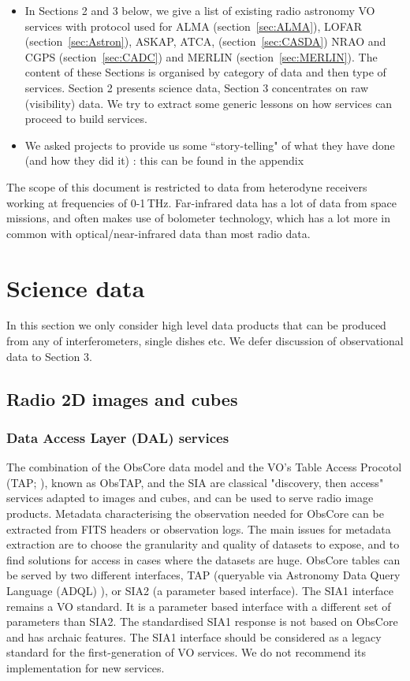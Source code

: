 \documentclass[11pt,a4paper]{ivoa}
\begin{document}
\begin{itemize}
\item  In Sections 2 and 3 below, we give a list of existing radio astronomy VO services with protocol 
used for ALMA (section~\ref{sec:ALMA}), LOFAR (section~\ref{sec:Astron}), ASKAP, ATCA,
(section~\ref{sec:CASDA}) NRAO and CGPS (section~\ref{sec:CADC}) and MERLIN (section~\ref{sec:MERLIN}).
The content of these Sections is organised  by category of data and then type of services. Section 2 
presents science data, Section 3 concentrates on raw (visibility) data. We try to extract some generic 
lessons on how services can proceed to build services.
\item We asked projects to provide us some ``story-telling" of what they have done (and how they did 
it) : this can be found in the appendix
\end{itemize}

The scope of this document is restricted to data from heterodyne receivers working at frequencies of 
0-1\,THz. Far-infrared data has a lot of data from space missions, and often makes use of bolometer 
technology, which has a lot more in common with optical/near-infrared data than most radio data.

\section{Science data}

In this section we only consider high level data products that can be produced from any of 
interferometers, single dishes etc. We defer discussion of observational data to Section 3.   



\subsection{Radio 2D images and cubes}
\subsubsection{Data Access Layer (DAL) services}
The combination of the ObsCore data model and the VO's Table Access Procotol (TAP; \cite{std:TAP}), 
known as ObsTAP, and the SIA are classical "discovery, then access" services adapted to images and 
cubes, and can be used to serve radio image products. Metadata characterising the observation needed for 
ObsCore can be extracted from FITS headers or observation logs. The main issues for metadata extraction 
are to choose the granularity and quality of datasets to expose, and to find solutions for access in 
cases where the datasets are huge. ObsCore tables can be served by two different interfaces, TAP  
(queryable via Astronomy Data Query Language (ADQL) \citep{2008ivoa.spec.1030O} ), or SIA2 (a parameter 
based interface). The SIA1 interface remains a VO standard. It is a parameter based interface with a 
different set of parameters than SIA2. The standardised SIA1 response is not based on ObsCore and has 
archaic features. The SIA1 interface should be considered as a legacy standard for the first-generation 
of VO services. We do not recommend its implementation for new services. 
\end{document}
